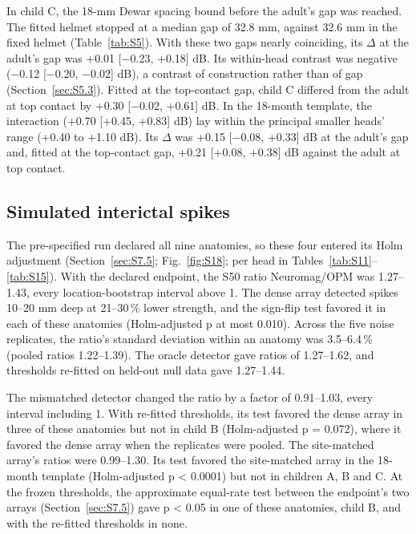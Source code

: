 \documentclass[preprint,12pt,authoryear,a4paper]{elsarticle}
\begin{document}
In child C, the 18-mm Dewar spacing bound before the adult's gap was reached. The fitted helmet stopped at a median gap of 32.8 mm, against 32.6 mm in the fixed helmet (Table~\ref{tab:S5}). With these two gaps nearly coinciding, its $\Delta$ at the adult's gap was +0.01 [−0.23, +0.18] dB. Its within-head contrast was negative (−0.12 [−0.20, −0.02] dB), a contrast of construction rather than of gap (Section~\ref{sec:S5.3}). Fitted at the top-contact gap, child C differed from the adult at top contact by +0.30 [−0.02, +0.61] dB. In the 18-month template, the interaction (+0.70 [+0.45, +0.83] dB) lay within the principal smaller heads' range (+0.40 to +1.10 dB). Its $\Delta$ was +0.15 [−0.08, +0.33] dB at the adult's gap and, fitted at the top-contact gap, +0.21 [+0.08, +0.38] dB against the adult at top contact.

\subsection{Simulated interictal spikes}\label{sec:S10.4}

The pre-specified run declared all nine anatomies, so these four entered its Holm adjustment (Section~\ref{sec:S7.5}; Fig.~\ref{fig:S18}; per head in Tables~\ref{tab:S11}--\ref{tab:S15}). With the declared endpoint, the S50 ratio Neuromag/OPM was 1.27–1.43, every location-bootstrap interval above 1. The dense array detected spikes 10–20 mm deep at 21–30\,\% lower strength, and the sign-flip test favored it in each of these anatomies (Holm-adjusted p at most 0.010). Across the five noise replicates, the ratio's standard deviation within an anatomy was 3.5–6.4\,\% (pooled ratios 1.22–1.39). The oracle detector gave ratios of 1.27–1.62, and thresholds re-fitted on held-out null data gave 1.27–1.44.

The mismatched detector changed the ratio by a factor of 0.91–1.03, every interval including 1. With re-fitted thresholds, its test favored the dense array in three of these anatomies but not in child B (Holm-adjusted p = 0.072), where it favored the dense array when the replicates were pooled. The site-matched array's ratios were 0.99–1.30. Its test favored the site-matched array in the 18-month template (Holm-adjusted p < 0.0001) but not in children A, B and C. At the frozen thresholds, the approximate equal-rate test between the endpoint's two arrays (Section~\ref{sec:S7.5}) gave p < 0.05 in one of these anatomies, child B, and with the re-fitted thresholds in none.

\FloatBarrier


\end{document}
